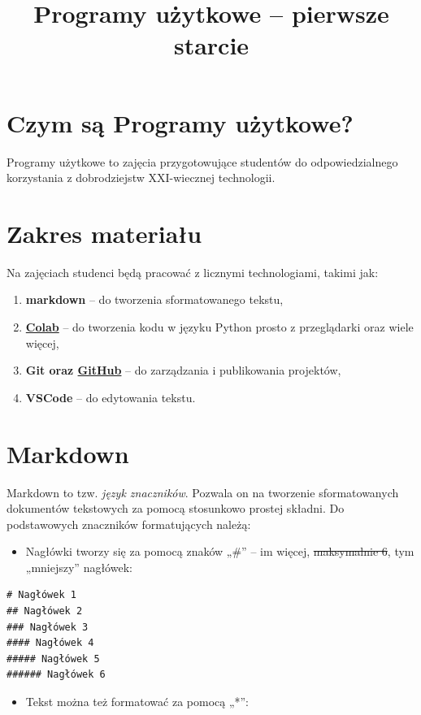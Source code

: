 \documentclass[12pt, a4paper]{article}
\title{\textbf{Programy użytkowe -- pierwsze starcie}}
\author{}
\date{}
\begin{document}
\maketitle

\section{Czym są Programy użytkowe?}
Programy użytkowe to zajęcia przygotowujące studentów do odpowiedzialnego korzystania z dobrodziejstw XXI-wiecznej technologii.

\section{Zakres materiału}
Na zajęciach studenci będą pracować z licznymi technologiami, takimi jak:
\begin{enumerate}
    \item \textbf{markdown} -- do tworzenia sformatowanego tekstu,
    \item \textbf{\href{http://colab.research.google.com/}{Colab}} -- do tworzenia kodu w języku Python prosto z przeglądarki oraz wiele więcej,
    \item \textbf{Git oraz \href{https://github.com/}{GitHub}} -- do zarządzania i publikowania projektów,
    \item \textbf{VSCode} -- do edytowania tekstu.
\end{enumerate}

\section{Markdown}
Markdown to tzw. \textit{język znaczników}. Pozwala on na tworzenie sformatowanych dokumentów tekstowych za pomocą stosunkowo prostej składni. Do podstawowych znaczników formatujących należą:

\begin{itemize}
    \item Nagłówki tworzy się za pomocą znaków „\#” -- im więcej, \sout{maksymalnie 6}, tym „mniejszy” nagłówek:
\end{itemize}

\begin{lstlisting}[caption=Nagłówki w Markdown]
# Nagłówek 1
## Nagłówek 2
### Nagłówek 3
#### Nagłówek 4
##### Nagłówek 5
###### Nagłówek 6
\end{lstlisting}

\begin{itemize}
    \item Tekst można też formatować za pomocą „*”:
\end{itemize}
\end{document}
